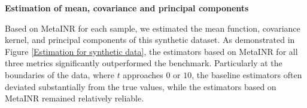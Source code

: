 \documentclass{article}
\begin{document}
\textbf{Estimation of mean, covariance and principal components}

Based on MetaINR for each sample, we estimated the mean function, covariance kernel, and principal components of this synthetic dataset. 
As demonstrated in Figure \ref{Estimation for synthetic data},
the estimators based on MetaINR for all three metrics significantly outperformed the benchmark. 
Particularly at the boundaries of the data, where $t$ approaches $0$ or $10$, 
the baseline estimators often deviated substantially from the true values,
while the estimators based on MetaINR remained relatively reliable.






\end{document}
